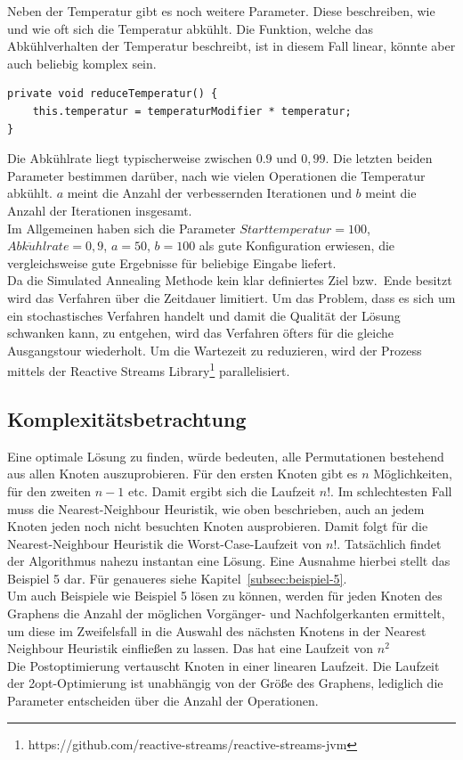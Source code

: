Neben der Temperatur gibt es noch weitere Parameter.
Diese beschreiben, wie und wie oft sich die Temperatur abkühlt.
Die Funktion, welche das Abkühlverhalten der Temperatur beschreibt, ist in diesem Fall linear, könnte aber auch beliebig komplex sein.
\begin{lstlisting}[label={lst:reduce-temperatur}]
private void reduceTemperatur() {
    this.temperatur = temperaturModifier * temperatur;
}
\end{lstlisting}
Die Abkühlrate liegt typischerweise zwischen $0.9$ und $0,99$.
Die letzten beiden Parameter bestimmen darüber, nach wie vielen Operationen die Temperatur abkühlt.
$a$ meint die Anzahl der verbessernden Iterationen und $b$ meint die Anzahl der Iterationen insgesamt.\\
Im Allgemeinen haben sich die Parameter $Starttemperatur = 100$, $Abk\ddot uhlrate = 0,9$, $a = 50$, $b = 100$ als gute
Konfiguration erwiesen, die vergleichsweise gute Ergebnisse für beliebige Eingabe liefert. \\
Da die Simulated Annealing Methode kein klar definiertes Ziel bzw.\ Ende besitzt wird das Verfahren über die Zeitdauer limitiert.
Um das Problem, dass es sich um ein stochastisches Verfahren handelt und damit die Qualität der Lösung schwanken kann,
zu entgehen, wird das Verfahren öfters für die gleiche Ausgangstour wiederholt.
Um die Wartezeit zu reduzieren, wird der Prozess mittels der Reactive Streams
Library\footnote{https://github.com/reactive-streams/reactive-streams-jvm} parallelisiert. \\

\subsection{Komplexitätsbetrachtung}\label{subsec:komplexitatsbetrachtung}
Eine optimale Lösung zu finden, würde bedeuten, alle Permutationen bestehend aus allen Knoten auszuprobieren.
Für den ersten Knoten gibt es $n$ Möglichkeiten, für den zweiten $n - 1$ etc.
Damit ergibt sich die Laufzeit $n!$.
Im schlechtesten Fall muss die Nearest-Neighbour Heuristik, wie oben beschrieben, auch an jedem Knoten jeden noch nicht besuchten Knoten ausprobieren.
Damit folgt für die Nearest-Neighbour Heuristik die Worst-Case-Laufzeit von $n!$.
Tatsächlich findet der Algorithmus nahezu instantan eine Lösung.
Eine Ausnahme hierbei stellt das Beispiel 5 dar.
Für genaueres siehe Kapitel~\ref{subsec:beispiel-5}. \\
Um auch Beispiele wie Beispiel 5 lösen zu können, werden für jeden Knoten des Graphens die Anzahl der möglichen
Vorgänger- und Nachfolgerkanten ermittelt, um diese im Zweifelsfall in die Auswahl des nächsten Knotens
in der Nearest Neighbour Heuristik einflie{\ss}en zu lassen.
Das hat eine Laufzeit von $n^2$ \\
Die Postoptimierung vertauscht Knoten in einer linearen Laufzeit.
Die Laufzeit der 2opt-Optimierung ist unabhängig von der Grö{\ss}e des Graphens, lediglich die Parameter entscheiden über die
Anzahl der Operationen.

